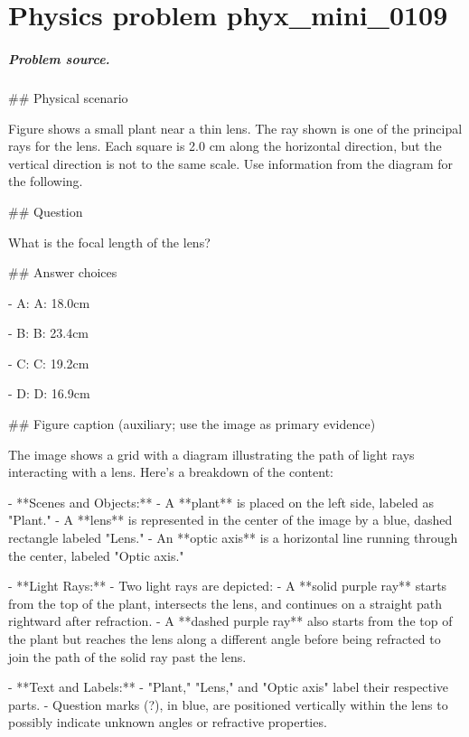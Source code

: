 
\chapter{Physics problem phyx\_mini\_0109}
\label{ch:PhyXMiniProblems_problem_phyx_mini_0109}

\paragraph{Problem source.}
\#\# Physical scenario

Figure shows a small plant near a thin lens. The ray shown is one of the principal rays for the lens. Each square is 2.0 cm along the horizontal direction, but the vertical direction is not to the same scale. Use information from the diagram for the following.

\#\# Question

What is the focal length of the lens?

\#\# Answer choices

- A: A: 18.0cm

- B: B: 23.4cm

- C: C: 19.2cm

- D: D: 16.9cm

\#\# Figure caption (auxiliary; use the image as primary evidence)

The image shows a grid with a diagram illustrating the path of light rays interacting with a lens. Here’s a breakdown of the content:

- **Scenes and Objects:**
  - A **plant** is placed on the left side, labeled as "Plant."
  - A **lens** is represented in the center of the image by a blue, dashed rectangle labeled "Lens."
  - An **optic axis** is a horizontal line running through the center, labeled "Optic axis."

- **Light Rays:**
  - Two light rays are depicted:
    - A **solid purple ray** starts from the top of the plant, intersects the lens, and continues on a straight path rightward after refraction.
    - A **dashed purple ray** also starts from the top of the plant but reaches the lens along a different angle before being refracted to join the path of the solid ray past the lens.

- **Text and Labels:**
  - "Plant," "Lens," and "Optic axis" label their respective parts.
  - Question marks (?), in blue, are positioned vertically within the lens to possibly indicate unknown angles or refractive properties.

